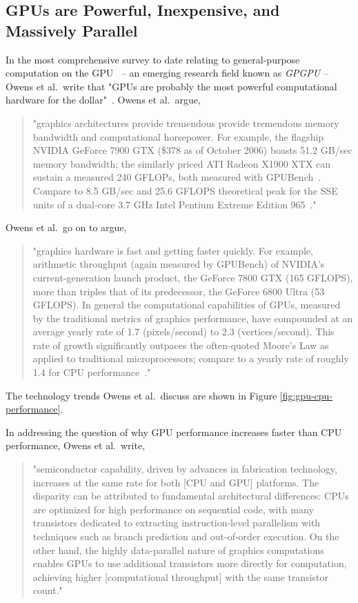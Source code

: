\subsection{GPUs are Powerful, Inexpensive, and Massively Parallel}
In the most comprehensive survey to date relating to general-purpose computation on the GPU~\cite{Owens-2007} -- an emerging research field known as \emph{GPGPU} -- Owens et al.\ write that "GPUs are probably the most powerful computational hardware for the dollar"~\cite{Owens-2007}. Owens et al.\ argue,
\begin{quote}
"graphics architectures provide tremendous provide tremendous memory bandwidth and computational horsepower. For example, the flagship NVIDIA GeForce 7900 GTX (\$378 as of October 2006) boasts 51.2 GB/sec memory bandwidth; the similarly priced ATI Radeon X1900 XTX can sustain a measured 240 GFLOPs, both measured with GPUBench~\cite{Buck-2004}. Compare to 8.5 GB/sec and 25.6 GFLOPS theoretical peak for the SSE units of a dual-core 3.7 GHz Intel Pentium Extreme Edition 965~\cite{Intel-2006}."~\cite{Owens-2007}
\end{quote}

Owens et al.\ go on to argue,
\begin{quote}
"graphics hardware is fast and getting faster quickly. For example, arithmetic throughput (again measured by GPUBench) of NVIDIA's current-generation launch product, the GeForce 7800 GTX (165 GFLOPS), more than triples that of its predecessor, the GeForce 6800 Ultra (53 GFLOPS). In general the computational capabilities of GPUs, measured by the traditional metrics of graphics performance, have compounded at an average yearly rate of 1.7 (pixels/second) to 2.3 (vertices/second). This rate of growth significantly outpaces the often-quoted Moore's Law as applied to traditional microprocessors; compare to a yearly rate of roughly 1.4 for CPU performance~\cite{Ekman-2005}."~\cite{Owens-2007}  
\end{quote}

The technology trends Owens et al.\ discuss are shown in Figure \ref{fig:gpu-cpu-performance}.

In addressing the question of why GPU performance increases faster than CPU performance, Owens et al.\ write,
\begin{quote}
"semiconductor capability, driven by advances in fabrication technology, increases at the same rate for both [CPU and GPU] platforms. The disparity can be attributed to fundamental architectural differences: CPUs are optimized for high performance on sequential code, with many transistors dedicated to extracting instruction-level parallelism with techniques such as branch prediction and out-of-order execution. On the other hand, the highly data-parallel nature of graphics computations enables GPUs to use additional transistors more directly for computation, achieving higher [computational throughput] with the same transistor count."~\cite{Owens-2007}
\end{quote}

